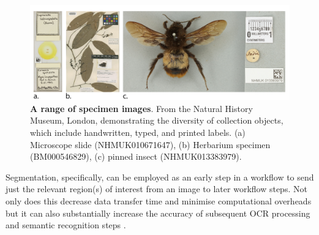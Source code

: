 \begin{figure}%
  \includegraphics[width=\textwidth]{figures/ch08/figure1.png}
	\caption[A range of specimen images]{\textbf{A range of specimen images}. From the Natural History Museum, London, demonstrating the
  diversity of collection objects, which include handwritten, typed, and
  printed labels. (a) Microscope slide (NHMUK010671647)\footnotemark{},
  (b) Herbarium specimen (BM000546829)\footnotemark{},
  (c) pinned insect (NHMUK013383979)\footnotemark{}.}
  \label{ch8:figure1}
\end{figure}

\addtocounter{footnote}{-3}
\addtocounter{footnote}{1}
\addtocounter{footnote}{1}
\addtocounter{footnote}{1}

Segmentation, specifically, can be employed as an early step in a
workflow to send just the relevant region(s) of interest from an image
to later workflow steps. Not only does this decrease data transfer time
and minimise computational overheads but it can also substantially
increase the accuracy of subsequent OCR processing and semantic
recognition steps \cite{Owen 2020}.

